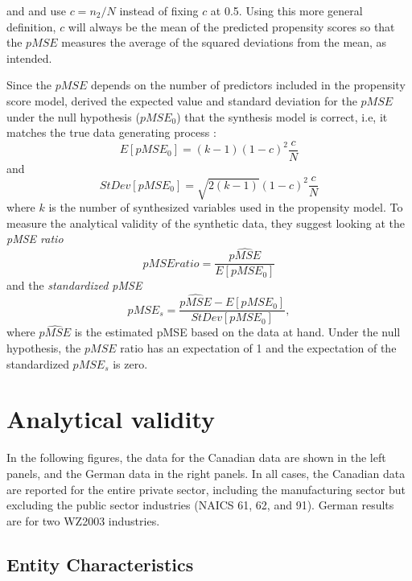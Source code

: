 \documentclass[10pt,twoside]{article}
\begin{document}
\citet{Woo_Reiter_Oganian_Karr_2009} and \citet{Snoke_RSSA2018} and use $c=n_2/N$ instead of fixing $c$ at 0.5. Using this more general definition, $c$ will always be the mean of the predicted propensity scores so that the $pMSE$ measures the average of the squared deviations from the mean, as intended. 

Since the $pMSE$ depends on the number of predictors included in the propensity score model, \textcite{Snoke_RSSA2018} derived the expected value and standard deviation for the $pMSE$ under the null hypothesis ($pMSE_0$) that the synthesis model is correct, i.e, it matches the true data generating process \parencite[Equation 1]{Snoke_RSSA2018}:
$$
E[pMSE_0] = (k-1)(1-c)^2 \frac{c}{N}
$$
and
$$
StDev[pMSE_0] = \sqrt{2(k-1)}(1-c)^2 \frac{c}{N}
$$
where $k$ is the number of synthesized variables used in the propensity model. To measure the analytical validity of the synthetic data, they suggest looking at the \textit{pMSE  ratio}
$$
pMSE ratio = \frac{\widehat{pMSE}}{E[pMSE_0]}
$$
and the \textit{standardized pMSE}
$$
pMSE_s =\frac{\widehat{pMSE}-E[pMSE_0]}{StDev[pMSE_0]},
$$
where $\widehat{pMSE}$ is the estimated pMSE based on the data at hand. Under the null hypothesis, the $pMSE$ ratio has an expectation of 1 and the expectation of the standardized $pMSE_s$ is zero.



\section{Analytical validity}
\label{sec:analytic}

\newcommand{\CanTableNote}{$LEAP$ is the Longitudinal Employment Analysis Program and $CanSynLBD$ is the Canadian synthetic database based on LEAP. }

In the following figures, the data for the Canadian data are shown in the left panels, and the German data in the right panels. In all cases, the Canadian data are reported for the entire private sector,  including the manufacturing sector but excluding  the public sector industries (NAICS 61, 62, and 91). German results are for two WZ2003 industries.

\subsection{Entity Characteristics}
\end{document}
